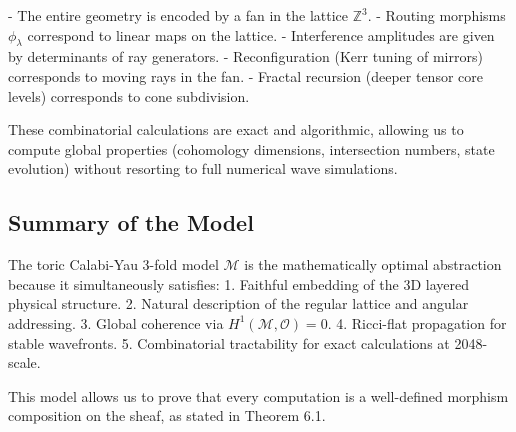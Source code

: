 - The entire geometry is encoded by a fan in the lattice \(\mathbb{Z}^3\).
- Routing morphisms \(\phi_\lambda\) correspond to linear maps on the lattice.
- Interference amplitudes are given by determinants of ray generators.
- Reconfiguration (Kerr tuning of mirrors) corresponds to moving rays in the fan.
- Fractal recursion (deeper tensor core levels) corresponds to cone subdivision.

These combinatorial calculations are exact and algorithmic, allowing us to compute global properties (cohomology dimensions, intersection numbers, state evolution) without resorting to full numerical wave simulations.

\subsection{Summary of the Model}

The toric Calabi-Yau 3-fold model \(\mathcal{M}\) is the mathematically optimal abstraction because it simultaneously satisfies:
1. Faithful embedding of the 3D layered physical structure.
2. Natural description of the regular lattice and angular addressing.
3. Global coherence via \(H^1(\mathcal{M}, \mathcal{O}) = 0\).
4. Ricci-flat propagation for stable wavefronts.
5. Combinatorial tractability for exact calculations at 2048-scale.

This model allows us to prove that every computation is a well-defined morphism composition on the sheaf, as stated in Theorem 6.1.


